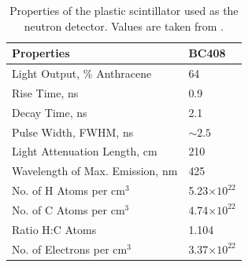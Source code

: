 \begin{table}[htp]
\centering
\begin{tabular}{ll}
Properties & BC408 \\
\hline
Light Output, \% Anthracene & 64 \\
Rise Time, ns & 0.9 \\
Decay Time, ns & 2.1 \\
Pulse Width, FWHM, ns & $\sim2.5$ \\
Light Attenuation Length, cm & 210 \\
Wavelength of Max. Emission, nm & 425 \\
No. of H Atoms per cm$^3$ & 5.23$\times10^{22}$ \\
No. of C Atoms per cm$^3$ & 4.74$\times10^{22}$ \\
Ratio H:C Atoms & 1.104 \\
No. of Electrons per cm$^3$ & 3.37$\times10^{22}$ \\
\end{tabular}
\caption{Properties of the plastic scintillator used as the neutron detector. Values are taken from \citep{BC408}.}
\label{tab:BC408}
\end{table}


